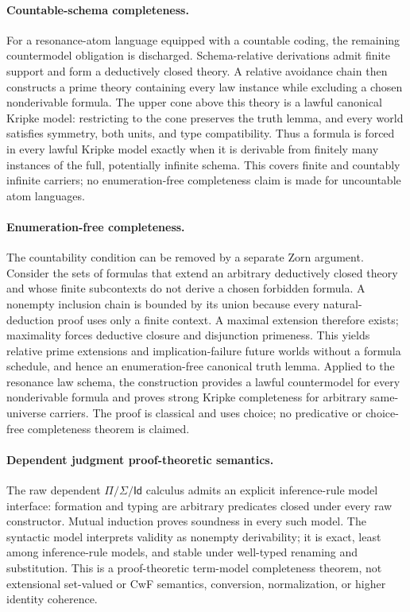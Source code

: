 \documentclass[11pt]{article}
\theoremstyle{definition}
\begin{document}
\paragraph{Countable-schema completeness.}
For a resonance-atom language equipped with a countable coding, the remaining
countermodel obligation is discharged. Schema-relative derivations admit finite
support and form a deductively closed theory. A relative avoidance chain then
constructs a prime theory containing every law instance while excluding a
chosen nonderivable formula. The upper cone above this theory is a lawful
canonical Kripke model: restricting to the cone preserves the truth lemma, and
every world satisfies symmetry, both units, and type compatibility. Thus a
formula is forced in every lawful Kripke model exactly when it is derivable
from finitely many instances of the full, potentially infinite schema. This
covers finite and countably infinite carriers; no enumeration-free completeness
claim is made for uncountable atom languages.

\paragraph{Enumeration-free completeness.}
The countability condition can be removed by a separate Zorn argument. Consider
the sets of formulas that extend an arbitrary deductively closed theory and
whose finite subcontexts do not derive a chosen forbidden formula. A nonempty
inclusion chain is bounded by its union because every natural-deduction proof
uses only a finite context. A maximal extension therefore exists; maximality
forces deductive closure and disjunction primeness. This yields relative prime
extensions and implication-failure future worlds without a formula schedule,
and hence an enumeration-free canonical truth lemma. Applied to the resonance
law schema, the construction provides a lawful countermodel for every
nonderivable formula and proves strong Kripke completeness for arbitrary
same-universe carriers. The proof is classical and uses choice; no predicative
or choice-free completeness theorem is claimed.

\paragraph{Dependent judgment proof-theoretic semantics.}
The raw dependent $\Pi/\Sigma/\mathsf{Id}$ calculus admits an explicit
inference-rule model interface: formation and typing are arbitrary predicates
closed under every raw constructor. Mutual induction proves soundness in every
such model. The syntactic model interprets validity as nonempty derivability;
it is exact, least among inference-rule models, and stable under well-typed
renaming and substitution. This is a proof-theoretic term-model completeness
theorem, not extensional set-valued or CwF semantics, conversion,
normalization, or higher identity coherence.
\end{document}
